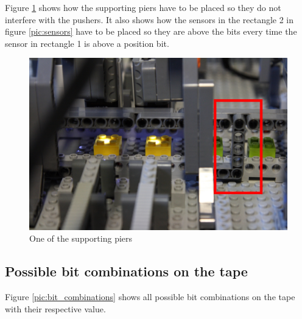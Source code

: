 \documentclass[%
  a4paper,%
  11pt,%
  blue,%
  hyperref	%
  ]{tubsartcl}
\begin{document}
\clearpage

Figure \ref{pic:supporting_pier} shows how the supporting piers have to be placed so they do not interfere with the pushers. It also shows how the sensors in the rectangle 2 in figure \ref{pic:sensors} have to be placed so they are above the bits every time the sensor in rectangle 1 is above a position bit.

\begin{figure}[!htb]
\begin{center}
\includegraphics[scale=0.3]{graphics_lego/supporting_pier.jpg}
\end{center}
\caption{One of the supporting piers}
\label{pic:supporting_pier}
\end{figure}

\clearpage

\subsection{Possible bit combinations on the tape}

Figure \ref{pic:bit_combinations} shows all possible bit combinations on the tape with their respective value.
\end{document}

